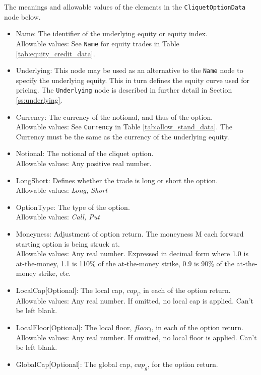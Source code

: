 The meanings and allowable values of the elements in the \lstinline!CliquetOptionData! node below.

\begin{itemize}
	\item Name: The identifier of the underlying equity or equity index. \\
	Allowable values: See \lstinline!Name! for equity trades in Table \ref{tab:equity_credit_data}.	
	\item Underlying:  This node may be used as an alternative to the \lstinline!Name! node to specify the underlying equity. This in turn defines the equity 		curve used for pricing. The \lstinline!Underlying! node is described in further detail in Section \ref{ss:underlying}. \\
	\item Currency: The currency of the notional, and thus of the option.  \\
	Allowable values: See \lstinline!Currency! in Table \ref{tab:allow_stand_data}. The Currency must be the same as the currency of the underlying equity.
	\item Notional: The notional of the cliquet option.\\
	Allowable values: Any positive real number.
	\item LongShort: Defines whether the trade is long or short the option. \\
	Allowable values: \emph{Long, Short}
	\item OptionType: The type of the option. \\
	Allowable values: \emph{Call, Put}
	\item Moneyness: Adjustment of option return. The moneyness M each forward starting option is being struck at.\\
	Allowable values: Any real number. Expressed in decimal form where 1.0 is at-the-money, 1.1 is 110\% of the at-the-money strike, 0.9  is 90\% of the at-the-money strike, etc.
	\item LocalCap[Optional]: The local cap, $cap_{l}$, in each of the option return. \\
	Allowable values: Any real number. If omitted, no local cap is applied. Can't be left blank.
	\item LocalFloor[Optional]: The local floor, $floor_{l}$, in each of the option return. \\
	Allowable values: Any real number. If omitted, no local floor is applied.  Can't be left blank.
	\item GlobalCap[Optional]: The global cap, $cap_{g}$, for the option return. \\

\end{itemize}
